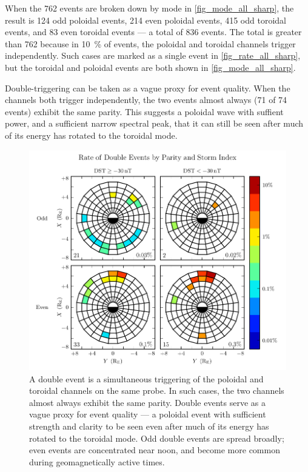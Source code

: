 When the 762 events are broken down by mode in \cref{fig_mode_all_sharp}, the
result is 124 odd poloidal events, 214 even poloidal events, 415 odd toroidal
events, and 83 even toroidal events --- a total of 836 events. The total is
greater than 762 because in \about\SI{10}{\percent} of events, the poloidal and
toroidal channels trigger independently. Such cases are marked as a single
event in \cref{fig_rate_all_sharp}, but the toroidal and poloidal events are
both shown in \cref{fig_mode_all_sharp}. 

Double-triggering can be taken as a vague proxy for event quality. When the
channels both trigger independently, the two events almost always (71 of 74
events) exhibit the same parity. This suggests a poloidal wave with suffient
power, and a sufficient narrow spectral peak, that it can still be seen after
much of its energy has rotated to the toroidal mode. 

\begin{figure}[!htb]
  \centering
  \includegraphics[width=\textwidth]{figures/double_rate_sharp.pdf}
  \caption[Rate of Double Pc4 Events by Parity and Storm Index]{
    A double event is a simultaneous triggering of the poloidal and toroidal
    channels on the same probe. In such cases, the two channels almost always
    exhibit the same parity. Double events serve as a vague proxy for event
    quality --- a poloidal event with sufficient strength and clarity to be
    seen even after much of its energy has rotated to the toroidal mode. Odd
    double events are spread broadly; even events are concentrated near noon,
    and become more common during geomagnetically active times. 
  }
  \label{fig_double_rate_sharp}
\end{figure}


